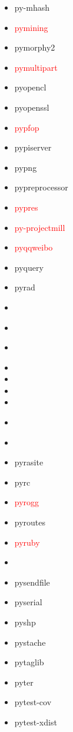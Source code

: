 \documentclass{l4proj}
\begin{document}
\begin{appendices}
{\begin{itemize}
\item py-mhash
\item\textcolor{red}{pymining}
\item pymorphy2
\item\textcolor{red}{pymultipart}
\item pyopencl
\item pyopenssl
\item\textcolor{red}{pypfop}
\item pypiserver
\item pypng
\item pypreprocessor
\item\textcolor{red}{pypres}
\item\textcolor{red}{py-projectmill}
\item\textcolor{red}{pyqqweibo}
\item pyquery
\item pyrad
\item {}
\item\textcolor{red}{}
\item\textcolor{red}{}
\item {}
\item {}
\item {}
\item {}
\item\textcolor{red}{}
\end{itemize}
}%
\noindent\parbox[t]{0.32\textwidth}{\raggedright%
\begin{itemize}
\item\textcolor{red}{}
\item pyrasite
\item pyrc
\item\textcolor{red}{pyrogg}
\item pyroutes
\item\textcolor{red}{pyruby}
\item {}
\item pysendfile
\item pyserial
\item pyshp
\item pystache
\item pytaglib
\item pyter
\item pytest-cov
\item pytest-xdist

\end{itemize}}
\end{appendices}
\end{document}

